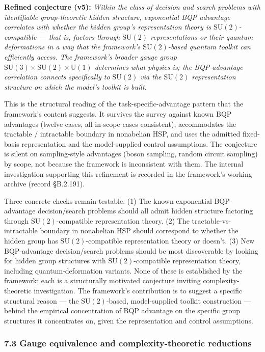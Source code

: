 \documentclass[
]{article}
\begin{document}
\textbf{Refined conjecture (v5):} \emph{Within the class of decision and
search problems with identifiable group-theoretic hidden structure,
exponential BQP advantage correlates with whether the hidden group's
representation theory is \(\mathrm{SU}(2)\)-compatible --- that is,
factors through \(\mathrm{SU}(2)\) representations or their quantum
deformations in a way that the framework's \(\mathrm{SU}(2)\)-based
quantum toolkit can efficiently access. The framework's broader gauge
group \(\mathrm{SU}(3) \times \mathrm{SU}(2) \times \mathrm{U}(1)\)
determines what physics is; the BQP-advantage correlation connects
specifically to \(\mathrm{SU}(2)\) via the \(\mathrm{SU}(2)\)
representation structure on which the model's toolkit is built.}

This is the structural reading of the task-specific-advantage pattern
that the framework's content suggests. It survives the survey against
known BQP advantages (twelve cases, all in-scope cases consistent),
accommodates the tractable / intractable boundary in nonabelian HSP, and
uses the admitted fixed-basis representation and the model-supplied
control assumptions. The conjecture is silent on sampling-style
advantages (boson sampling, random circuit sampling) by scope, not
because the framework is inconsistent with them. The internal
investigation supporting this refinement is recorded in the framework's
working archive (record §B.2.191).

Three concrete checks remain testable. (1) The known
exponential-BQP-advantage decision/search problems should all admit
hidden structure factoring through \(\mathrm{SU}(2)\)-compatible
representation theory. (2) The tractable-vs-intractable boundary in
nonabelian HSP should correspond to whether the hidden group has
\(\mathrm{SU}(2)\)-compatible representation theory or doesn't. (3) New
BQP-advantage decision/search problems should be most discoverable by
looking for hidden group structures with \(\mathrm{SU}(2)\)-compatible
representation theory, including quantum-deformation variants. None of
these is established by the framework; each is a structurally motivated
conjecture inviting complexity-theoretic investigation. The framework's
contribution is to suggest a specific structural reason --- the
\(\mathrm{SU}(2)\)-based, model-supplied toolkit construction --- behind
the empirical concentration of BQP advantage on the specific group
structures it concentrates on, given the representation and control
assumptions.

\hypertarget{gauge-equivalence-and-complexity-theoretic-reductions}{%
\subsubsection{7.3 Gauge equivalence and complexity-theoretic
reductions}\label{gauge-equivalence-and-complexity-theoretic-reductions}}
\end{document}

